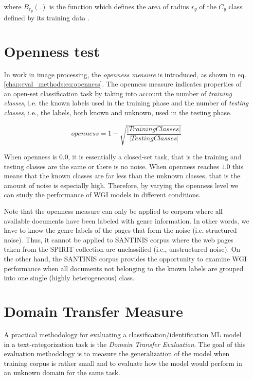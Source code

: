 \noindent
where $B_{r_{y}}(.)$ is the function which defines the area of radius $r_{y}$ of the $C_{y}$ class defined by its training data \parencite{fei2016breaking}.

\section{Openness test}\label{chap:eval_methods:sec:open_space_risk}

In \parencite{scheirer2013toward} work in image processing, the \textit{openness measure} is introduced, as shown in eq. \ref{chap:eval_methods:eq:openness}. The openness measure indicates properties of an open-set classification task by taking into account the number of \textit{training classes}, i.e. the known labels used in the training phase and the number of \textit{testing classes}, i.e., the labels, both known and unknown, used in the testing phase.

\begin{equation}\label{chap:eval_methods:eq:openness}
	openness=1-\sqrt{\frac{ | Training Classes | }{ |Testing Classes | }}
\end{equation}

When openness is $0.0$, it is essentially a closed-set task, that is the training and testing classes are the same or there is no noise. When openness reaches $1.0$ this means that the known classes are far less than the unknown classes, that is the amount of noise is especially high. Therefore, by varying the openness level we can study the performance of WGI models in different conditions.

Note that the openness measure can only be applied to corpora where all available documents have been labeled with genre information. In other words, we have to know the genre labels of the pages that form the noise (i.e. structured noise). Thus, it cannot be applied to SANTINIS corpus where the web pages taken from the SPIRIT collection are unclassified (i.e., unstructured noise). On the other hand, the SANTINIS corpus provides the opportunity to examine WGI performance when all documents not belonging to the known labels are grouped into one single (highly heterogeneous) class.


\section{Domain Transfer Measure}\label{chap:eval_methods:sec:domain_transfer_measure}

A practical methodology for evaluating a classification/identification ML model in a text-categorization task is the \textit{Domain Transfer Evaluation}. The goal of this evaluation methodology is to measure the generalization of the model when training corpus is rather small and to evaluate how the model would perform in an unknown domain for the same task. 

